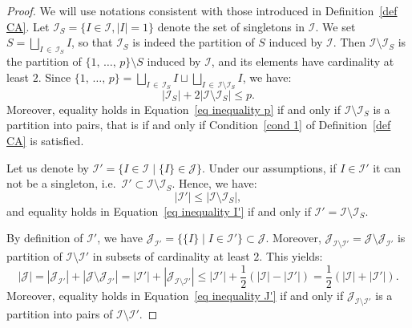 \documentclass[AHL,Unicode,longabstracts,published]{cedram}
\newcommand{\I}{\mathcal{I}}
\newcommand{\J}{\mathcal{J}}
\newcommand{\norm}[1]{\left\lvert #1 \right\rvert}
\renewcommand{\leq}{\leqslant}
\begin{document}
\begin{proof}
We will use notations consistent with those introduced in Definition~\ref{def CA}. Let $\I_S=\{I \in \I, |I| =1 \}$ denote the set of singletons in $\I$. We set $S= \bigsqcup_{I \,\in\,\I_S} I$, so that $\I_S$ is indeed the partition of $S$ induced by $\I$. Then $\I \setminus \I_S$ is the partition of $\{1,\,\dots,\,p\} \setminus S$ induced by $\I$, and its elements have cardinality at least $2$. Since $\{1,\,\dots,\,p\} = \bigsqcup_{I\,\in\,\I_S} I \sqcup \bigsqcup_{I\,\in\,\I \setminus \I_S} I$, we have:
\begin{equation}\label{eq inequality p}
\norm{\I_S} + 2\norm{\I \setminus \I_S} \leq p.
\end{equation}
Moreover, equality holds in Equation~\eqref{eq inequality p} if and only if $\I \setminus \I_S$ is a partition into pairs, that is if and only if Condition~\eqref{cond 1} of Definition~\ref{def CA} is satisfied.

Let us denote by $\I' = \{I \in \I \mid \{I\} \in \J\}$. Under our assumptions, if $I \in \I'$ it can not be a singleton, i.e.~$\I' \subset \I \setminus \I_S$. Hence, we have:
\begin{equation}\label{eq inequality I'}
\norm{\I'} \leq \norm{\I \setminus \I_S},
\end{equation}
and equality holds in Equation~\eqref{eq inequality I'} if and only if $\I' = \I \setminus \I_S$.

By definition of $\I'$, we have $\J_{\I'} = \{\{I\} \mid I \in \I'\} \subset \J$. Moreover, $\J_{\I \setminus \I'} = \J \setminus \J_{\I'}$ is partition of $\I \setminus \I'$ in subsets of cardinality at least $2$. This yields:
\begin{equation}\label{eq inequality J'}
\norm{\J} = \norm{\J_{\I'}} + \norm{\J \setminus \J_{\I'}} = \norm{\I'} + \norm{\J_{\I \setminus \I'} }\leq \norm{\I'} + \frac{1}{2}\left(\norm{\I}-\norm{\I'}\right) = \frac{1}{2}\left(\norm{\I}+\norm{\I'}\right).
\end{equation}
Moreover, equality holds in Equation~\eqref{eq inequality J'} if and only if $\J_{\I \setminus \I'}$ is a partition into pairs of $\I \setminus \I'$.


\end{proof}
\end{document}
